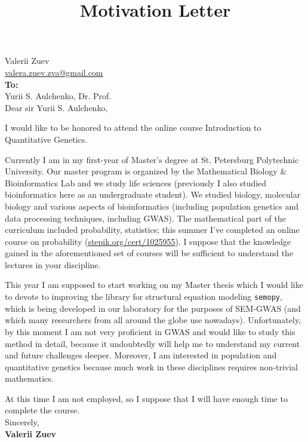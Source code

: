 \documentclass[a4paper,12pt]{article} %
\begin{document}
\title{Motivation Letter}
\date{}
\maketitle

\justifying

\noindent Valerii Zuev\\
\href{mailto:valera.zuev.zva@gmail.com}{valera.zuev.zva@gmail.com} \\

\noindent \textbf{To:} \\
Yurii S. Aulchenko, Dr. Prof. \\

Dear sir Yurii S. Aulchenko,

I would like to be honored to attend the online course Introduction to Quantitative Genetics.

Currently I am in my first-year of Master's degree at St. Petersburg Polytechnic University.
Our master program is organized by the Mathematical Biology \& Bioinformatics Lab and we study life sciences (previously I also studied bioinformatics here as an undergraduate student).
We studied biology, molecular biology and various aspects of bioinformatics (including population genetics and data processing techniques, including GWAS).
The mathematical part of the curriculum included probability, statistics; this summer I've completed an online course on probability (\href{https://stepik.org/cert/1025955}{stepik.org/cert/1025955}). I suppose that the knowledge gained in the aforementioned set of courses will be sufficient to understand the lectures in your discipline.

This year I am supposed to start working on my Master thesis which I would like to devote to improving the library for structural equation modeling \texttt{semopy}, which is being developed in our laboratory for the purposes of SEM-GWAS (and which many researchers from all around the globe use nowadays).
Unfortunately, by this moment I am not very proficient in GWAS and would like to study this method in detail, because it undoubtedly will help me to understand my current and future challenges deeper.
Moreover, I am interested in population and quantitative genetics because much work in these disciplines requires non-trivial mathematics.


At this time I am not employed, so I suppose that I will have enough time to complete the course. \\

\noindent Sincerely, \\
\textbf{Valerii Zuev}
\end{document}
